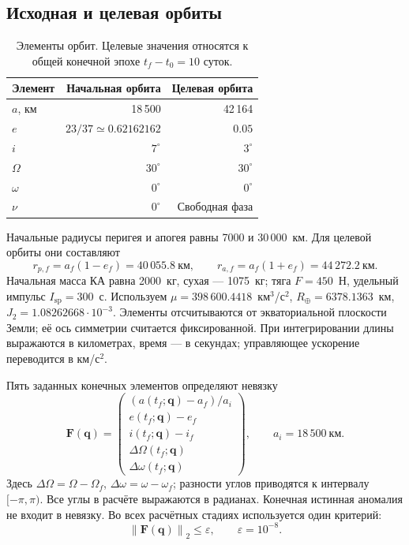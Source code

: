 \documentclass[a4paper,11pt]{article}
\newcommand{\vect}[1]{\boldsymbol{#1}}
\newcommand{\norm}[1]{\left\lVert#1\right\rVert}
\numberwithin{equation}{section}
\begin{document}
\subsection{Исходная и целевая орбиты}

\begin{table}[htbp]
\centering
\renewcommand{\arraystretch}{1.14}
\begin{tabular}{@{}lrr@{}}
\toprule
Элемент & Начальная орбита & Целевая орбита\\\midrule
$a$, км & 18\,500 & 42\,164\\
$e$ & $23/37\simeq0.62162162$ & $0.05$\\
$i$ & $7^\circ$ & $3^\circ$\\
$\Omega$ & $30^\circ$ & $30^\circ$\\
$\omega$ & $0^\circ$ & $0^\circ$\\
$\nu$ & $0^\circ$ & Свободная фаза\\
\bottomrule
\end{tabular}
\caption{Элементы орбит. Целевые значения относятся к общей
конечной эпохе $t_f-t_0=10$ суток.}
\label{tab:inputs}
\end{table}

Начальные радиусы перигея и апогея равны 7000 и 30\,000~км.
Для целевой орбиты они составляют
\[
r_{p,f}=a_f(1-e_f)=40\,055.8~\text{км},\qquad
r_{a,f}=a_f(1+e_f)=44\,272.2~\text{км}.
\]
Начальная масса КА равна 2000~кг, сухая --- 1075~кг;
тяга $F=450$~Н, удельный импульс $I_{\mathrm{sp}}=300$~с.
Используем $\mu=398\,600.4418$~км$^3$/с$^2$,
$R_\oplus=6378.1363$~км, $J_2=1.08262668\cdot10^{-3}$.
Элементы отсчитываются от экваториальной плоскости Земли;
её ось симметрии считается фиксированной.
При интегрировании длины выражаются в километрах, время ---
в секундах; управляющее ускорение переводится в км/с$^2$.

Пять заданных конечных элементов определяют невязку
\begin{equation}
\vect F(\vect q)=
\begin{pmatrix}
(a(t_f;\vect q)-a_f)/a_i\\
e(t_f;\vect q)-e_f\\
i(t_f;\vect q)-i_f\\
\Delta\Omega(t_f;\vect q)\\
\Delta\omega(t_f;\vect q)
\end{pmatrix},
\qquad a_i=18\,500~\text{км}.
\label{eq:kepler-residual}
\end{equation}
Здесь $\Delta\Omega=\Omega-\Omega_f$,
$\Delta\omega=\omega-\omega_f$; разности углов приводятся
к интервалу $[-\pi,\pi)$. Все углы в расчёте выражаются
в радианах. Конечная истинная аномалия не входит в невязку.
Во всех расчётных стадиях используется один критерий:
\begin{equation}
\norm{\vect F(\vect q)}_2\leqslant\varepsilon,
\qquad \varepsilon=10^{-8}.
\label{eq:kepler-criterion}
\end{equation}
\end{document}
